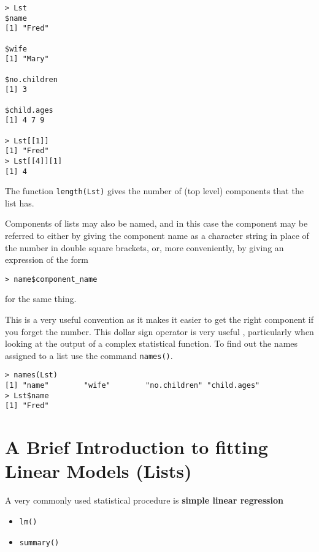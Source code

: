 \documentclass[a4paper,12pt]{article}
\begin{document}
\begin{framed}
\begin{verbatim}
> Lst
$name
[1] "Fred"

$wife
[1] "Mary"

$no.children
[1] 3

$child.ages
[1] 4 7 9

> Lst[[1]]
[1] "Fred"
> Lst[[4]][1]
[1] 4
\end{verbatim}
\end{framed}



The function \texttt{length(Lst)} gives the number of (top level) components that the list has.

Components of lists may also be named, and in this case the component may be referred to either by giving the component name as a character string in place of the number in double square brackets, or, more conveniently, by giving an expression of the form

\begin{verbatim}
> name$component_name
\end{verbatim}

for the same thing.

This is a very useful convention as it makes it easier to get the right component if you forget the number. This dollar sign operator is very useful , particularly when looking at the output of a complex statistical function. To find out the names assigned to a list use the command \texttt{names()}.

\begin{verbatim}
> names(Lst)
[1] "name"        "wife"        "no.children" "child.ages"
> Lst$name
[1] "Fred"
\end{verbatim}

\section{A Brief Introduction to fitting Linear Models (Lists)}

A very commonly used statistical procedure is \textbf{simple linear regression}
\begin{itemize}
\item \texttt{lm()}
\item \texttt{summary()}
\end{itemize}
\end{document}
